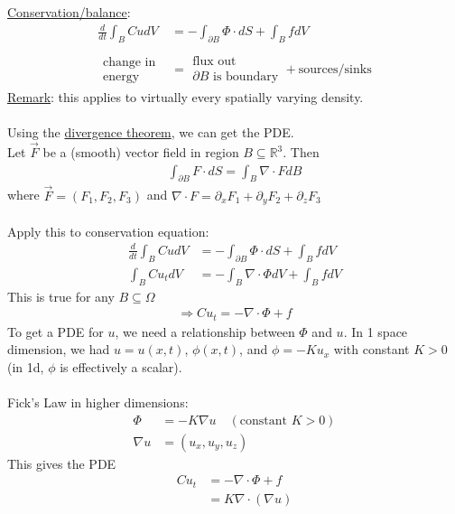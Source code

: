 \documentclass[12pt, letterpaper]{article}
\begin{document}
\underline{Conservation/balance}:
\begin{align*}
    \frac{d}{dt} \int_{B} CudV &= - \int_{\partial B} \Phi \cdot dS + \int_{B}fdV \\ \\
    \begin{matrix}
        \text{change in} \\ \text{energy} 
    \end{matrix} &= 
    \begin{matrix}
        \text{flux out} \\ \partial B\text{ is boundary}
    \end{matrix} + \text{sources/sinks}
\end{align*}
\underline{Remark}: this applies to virtually every spatially varying density. \\ \\
Using the \underline{divergence theorem}, we can get the PDE. \\
Let $\vec F$ be a (smooth) vector field in region $B \subseteq \mathbb{R}^3$. Then 
\begin{align*}
    \int_{\partial B} F \cdot dS = \int_{B} \nabla \cdot F dB
\end{align*}
where $\vec F = (F_1,F_2,F_3)$ and $\nabla \cdot F = \partial_x F_1 + \partial_y F_2 + \partial_z F_3$ \\ \\
Apply this to conservation equation:
\begin{align*}
    \frac{d}{dt} \int_{B}CudV &= - \int_{\partial B} \Phi \cdot dS + \int_{B}fdV \\
    \int_{B} Cu_t dV &= - \int_{B} \nabla \cdot \Phi dV + \int_{B} fdV
\end{align*}
This is true for any $B \subseteq \Omega$
\begin{align*}
    \Rightarrow Cu_t = - \nabla \cdot \Phi + f
\end{align*}
To get a PDE for $u$, we need a relationship between $\Phi$ and $u$. In 1 space dimension, we had 
$u = u(x,t)$, $\phi(x,t)$, and $\phi = -Ku_x$ with constant $K > 0$ (in 1d, $\phi$ is effectively 
a scalar). \\ \\ 
Fick's Law in higher dimensions:
\begin{align*}
    \Phi &= -K \nabla u \quad (\text{constant } K > 0) \\
    \nabla u &= (u_x, u_y, u_z)
\end{align*}
This gives the PDE 
\begin{align*}
    Cu_t &= - \nabla \cdot \Phi + f \\
    &= K\nabla \cdot (\nabla u)
\end{align*}
\end{document}
